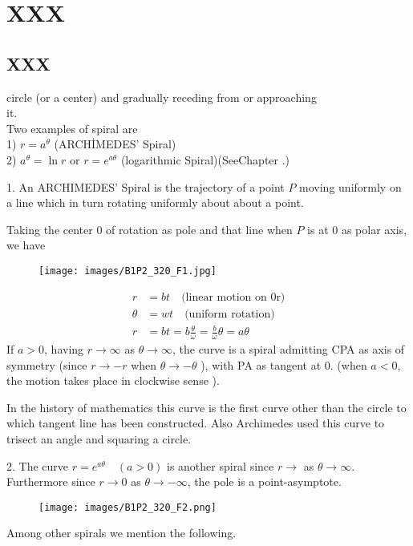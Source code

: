 \documentclass[11pt]{amsbook}
\begin{document}
\chapter{XXX}
\label{chap:FuncLimCont}




\section{XXX}
\label{sec:Numbers}

circle (or a center) and gradually receding from or approaching \\
it.\\ Two examples of spiral are \\ 
%
1) $r=a^\theta$ (ARCHİMEDES' Spiral)\\
%
2) $a^\theta =\ln r$ or  $r=e^{a \theta}$  (logarithmic  Spiral)(See\quad Chapter .)

%
 1. An ARCHIMEDES' Spiral is the trajectory of a point $P$ 
 moving uniformly on a line 
which in turn rotating uniformly about about a point. 

Taking the center 0 of rotation 
as pole and that line when $P$ is at 0
as polar axis, we have
\begin{figure}[h]
	\texttt{[image: images/B1P2\_320\_F1.jpg]}
\end{figure}
\begin{align*}
	r &= bt \quad \text{(linear motion on 0r)}\\
	\theta &= wt \quad \text{(uniform rotation)}\\
	r &= bt 
		= b \frac{\theta}{\omega}
		= \frac{b}{\omega}\theta
		= a\theta
\end{align*}
If $a > 0$, 
having $r \rightarrow \infty $ as $ \theta \rightarrow \infty $, 
the curve is a spiral admitting CPA as axis of symmetry 
(since $r \rightarrow -r$ when $\theta \rightarrow - \theta$ ), 
with PA as tangent at 0. (when $a<0$, the motion takes place
in clockwise sense ).

In the history of mathematics this curve is the first curve other than
the circle to which tangent line has been constructed. 
Also Archimedes used this curve to trisect an angle and squaring a circle.

%
2. The curve $r=e^{a\theta} \quad (a>0)$ is another spiral 
since $r \rightarrow $ as $\theta \rightarrow \infty$. 
Furthermore since 
$r \rightarrow 0$ as $\theta \rightarrow -\infty $, 
the pole is a point-asymptote.
\begin{figure}[h]
	\texttt{[image: images/B1P2\_320\_F2.png]}\\
\end{figure}
Among other spirals we mention the following.
\end{document}

